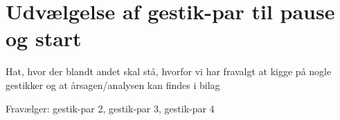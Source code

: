 \section{Udvælgelse af gestik-par til pause og start}
\label{TestresultaterPauseStart}
%
Hat, hvor der blandt andet skal stå, hvorfor vi har fravalgt at kigge på nogle gestikker og at årsagen/analysen kan findes i bilag 

Fravælger: gestik-par 2, gestik-par 3, gestik-par 4\blankline
%
